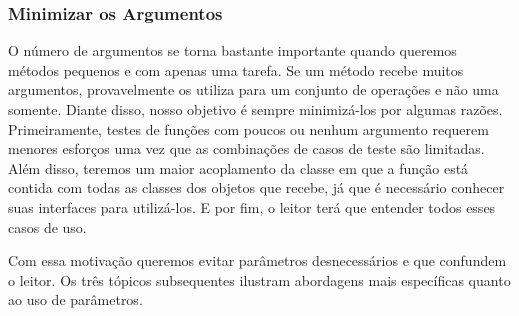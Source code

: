 \subsubsection{Minimizar os Argumentos}
O número de argumentos se torna bastante importante quando queremos métodos pequenos e com apenas uma tarefa. Se um método recebe muitos argumentos, provavelmente os utiliza para um conjunto de operações e não uma somente. Diante disso, nosso objetivo é sempre minimizá-los por algumas razões. Primeiramente, testes de funções com poucos ou nenhum argumento requerem menores esforços  uma vez que as combinações de casos de teste são limitadas. Além disso, teremos um maior acoplamento da classe em que a função está contida com todas as classes dos objetos que recebe, já que é necessário conhecer suas interfaces para utilizá-los. E por fim, o leitor terá que entender todos esses casos de uso.

Com essa motivação queremos evitar parâmetros desnecessários e que confundem o leitor. Os três tópicos subsequentes ilustram abordagens mais específicas quanto ao uso de parâmetros.

